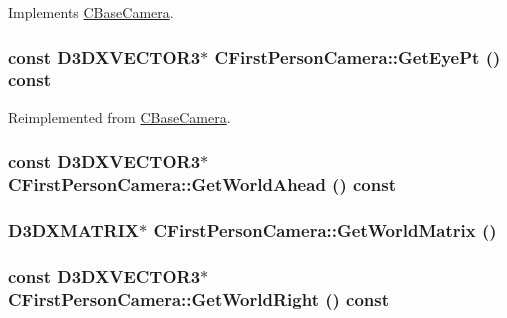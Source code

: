 Implements \hyperlink{class_c_base_camera_a21db15a8cdca60d1540d958a32708703}{CBaseCamera}.\hypertarget{class_c_first_person_camera_a0191f784e950825ac77825ef5c3b6295}{
\subsubsection[{GetEyePt}]{\setlength{\rightskip}{0pt plus 5cm}const D3DXVECTOR3$\ast$ CFirstPersonCamera::GetEyePt () const}}
\label{class_c_first_person_camera_a0191f784e950825ac77825ef5c3b6295}


Reimplemented from \hyperlink{class_c_base_camera_ae08632cf51cc263cdd2d78eea8af442a}{CBaseCamera}.\hypertarget{class_c_first_person_camera_ab672fff686f1f13a88997176bdd2bd04}{
\subsubsection[{GetWorldAhead}]{\setlength{\rightskip}{0pt plus 5cm}const D3DXVECTOR3$\ast$ CFirstPersonCamera::GetWorldAhead () const}}
\label{class_c_first_person_camera_ab672fff686f1f13a88997176bdd2bd04}
\hypertarget{class_c_first_person_camera_af24e375a682bac077ab06c24a22870e3}{
\subsubsection[{GetWorldMatrix}]{\setlength{\rightskip}{0pt plus 5cm}D3DXMATRIX$\ast$ CFirstPersonCamera::GetWorldMatrix ()}}
\label{class_c_first_person_camera_af24e375a682bac077ab06c24a22870e3}
\hypertarget{class_c_first_person_camera_a0ca46ea7c1d52786b1f149b4a12be986}{
\subsubsection[{GetWorldRight}]{\setlength{\rightskip}{0pt plus 5cm}const D3DXVECTOR3$\ast$ CFirstPersonCamera::GetWorldRight () const}}
